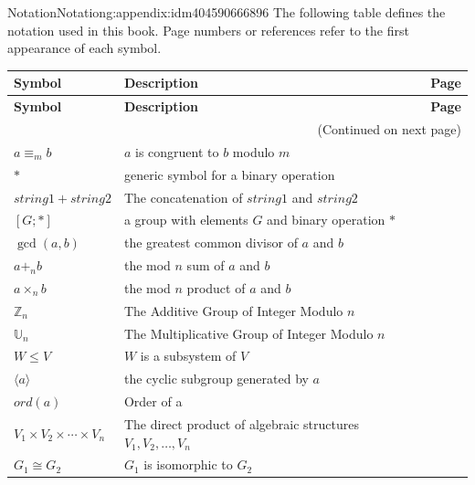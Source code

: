 \documentclass[twoside,10pt,]{book}
\numberwithin{equation}{section}
\begin{document}
\begin{appendixptx}{Notation}{}{Notation}{}{}{g:appendix:idm404590666896}
The following table defines the notation used in this book. Page numbers or references refer to the first appearance of each symbol.%
\begin{longtable}[l]{lp{}r}
\addtocounter{table}{-1}
\textbf{Symbol}&\textbf{Description}&\textbf{Page}\\[1em]
\endfirsthead
\textbf{Symbol}&\textbf{Description}&\textbf{Page}\\[1em]
\endhead
\multicolumn{3}{r}{(Continued on next page)}\\
\endfoot
\endlastfoot
\(a \equiv_m b\)&\(a\) is congruent to \(b\) modulo \(m\)&\pageref{g:notation:idm404603090912}\\
\(*\)&generic symbol for a binary operation&\pageref{g:notation:idm404595375840}\\
\(string1 + string2\)&The concatenation of \(string1\) and \(string2\)&\pageref{g:notation:idm404595151664}\\
\([G;*]\)&a group with elements \(G\) and binary operation \(*\)&\pageref{g:notation:idm404595111344}\\
\(\gcd(a,b)\)&the greatest common divisor of \(a\) and \(b\)&\pageref{g:notation:idm404594853392}\\
\(a +_n b\)&the mod \(n\) sum of \(a\) and \(b\)&\pageref{g:notation:idm404595434352}\\
\(a \times_n b\)&the mod \(n\) product of \(a\) and \(b\)&\pageref{g:notation:idm404595452368}\\
\(\mathbb{Z}_n\)&The Additive Group of Integer Modulo \(n\)&\pageref{g:notation:idm404594806256}\\
\(\mathbb{U}_n\)&The Multiplicative Group of Integer Modulo \(n\)&\pageref{g:notation:idm404594796528}\\
\(W \leq  V\)&\(W\) is a subsystem of \(V\)&\pageref{g:notation:idm404594703600}\\
\(\langle a \rangle\)&the cyclic subgroup generated by \(a\)&\pageref{g:notation:idm404594597552}\\
\(ord(a)\)&Order of a&\pageref{g:notation:idm404594585024}\\
\(V_1\times V_2 \times \cdots \times V_n\)&The direct product of algebraic structures \(V_1,  V_2, \dots , V_n \)&\pageref{g:notation:idm404594494080}\\
\(G_1 \cong G_2\)&\(G_1\) is isomorphic to \(G_2\)&\pageref{g:notation:idm404594301584}\\

\end{longtable}
\end{appendixptx}
\end{document}

